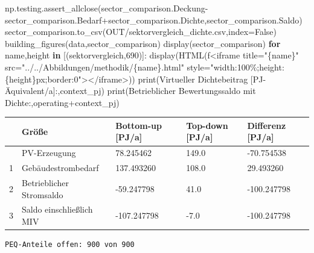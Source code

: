 \documentclass[
  ngerman,
  a4paper,
  DIV=11]{scrreprt}
\newenvironment{Shaded}{\begin{snugshade}}{\end{snugshade}}
\newcommand{\BuiltInTok}[1]{\textcolor[rgb]{0.00,0.23,0.31}{#1}}
\newcommand{\ControlFlowTok}[1]{\textcolor[rgb]{0.00,0.23,0.31}{\textbf{#1}}}
\newcommand{\DecValTok}[1]{\textcolor[rgb]{0.68,0.00,0.00}{#1}}
\newcommand{\KeywordTok}[1]{\textcolor[rgb]{0.00,0.23,0.31}{\textbf{#1}}}
\newcommand{\NormalTok}[1]{\textcolor[rgb]{0.00,0.23,0.31}{#1}}
\newcommand{\OperatorTok}[1]{\textcolor[rgb]{0.37,0.37,0.37}{#1}}
\newcommand{\SpecialCharTok}[1]{\textcolor[rgb]{0.37,0.37,0.37}{#1}}
\newcommand{\SpecialStringTok}[1]{\textcolor[rgb]{0.13,0.47,0.30}{#1}}
\newcommand{\StringTok}[1]{\textcolor[rgb]{0.13,0.47,0.30}{#1}}
\newcommand{\VariableTok}[1]{\textcolor[rgb]{0.07,0.07,0.07}{#1}}
\newcounter{none} %
\begin{document}
\begin{Shaded}
\begin{Highlighting}[]
\NormalTok{np.testing.assert\_allclose(sector\_comparison.Deckung}\OperatorTok{{-}}\NormalTok{sector\_comparison.Bedarf}\OperatorTok{+}\NormalTok{sector\_comparison.Dichte,sector\_comparison.Saldo)}
\NormalTok{sector\_comparison.to\_csv(OUT}\OperatorTok{/}\StringTok{\textquotesingle{}sektorvergleich\_dichte.csv\textquotesingle{}}\NormalTok{,index}\OperatorTok{=}\VariableTok{False}\NormalTok{)}
\NormalTok{building\_figures(data,sector\_comparison)}
\NormalTok{display(sector\_comparison)}
\ControlFlowTok{for}\NormalTok{ name,height }\KeywordTok{in}\NormalTok{ [(}\StringTok{\textquotesingle{}sektorvergleich\textquotesingle{}}\NormalTok{,}\DecValTok{690}\NormalTok{)]:}
\NormalTok{    display(HTML(}\SpecialStringTok{f\textquotesingle{}\textless{}iframe title="}\SpecialCharTok{\{}\NormalTok{name}\SpecialCharTok{\}}\SpecialStringTok{" src="../../Abbildungen/methodik/}\SpecialCharTok{\{}\NormalTok{name}\SpecialCharTok{\}}\SpecialStringTok{.html" style="width:100\%;height:}\SpecialCharTok{\{}\NormalTok{height}\SpecialCharTok{\}}\SpecialStringTok{px;border:0"\textgreater{}\textless{}/iframe\textgreater{}\textquotesingle{}}\NormalTok{))}
\BuiltInTok{print}\NormalTok{(}\StringTok{\textquotesingle{}Virtueller Dichtebeitrag [PJ{-}Äquivalent/a]:\textquotesingle{}}\NormalTok{,context\_pj)}
\BuiltInTok{print}\NormalTok{(}\StringTok{\textquotesingle{}Betrieblicher Bewertungssaldo mit Dichte:\textquotesingle{}}\NormalTok{,operating}\OperatorTok{+}\NormalTok{context\_pj)}
\end{Highlighting}
\end{Shaded}

{\def\LTcaptype{none} %
\begin{longtable}[]{@{}lllll@{}}
\toprule\noalign{}
& Größe & Bottom-up {[}PJ/a{]} & Top-down {[}PJ/a{]} & Differenz
{[}PJ/a{]} \\
\midrule\noalign{}
\endhead
\bottomrule\noalign{}
\endlastfoot
0 & PV-Erzeugung & 78.245462 & 149.0 & -70.754538 \\
1 & Gebäudestrombedarf & 137.493260 & 108.0 & 29.493260 \\
2 & Betrieblicher Stromsaldo & -59.247798 & 41.0 & -100.247798 \\
3 & Saldo einschließlich MIV & -107.247798 & -7.0 & -100.247798 \\
\end{longtable}
}

\begin{verbatim}
PEQ-Anteile offen: 900 von 900
\end{verbatim}
\end{document}
